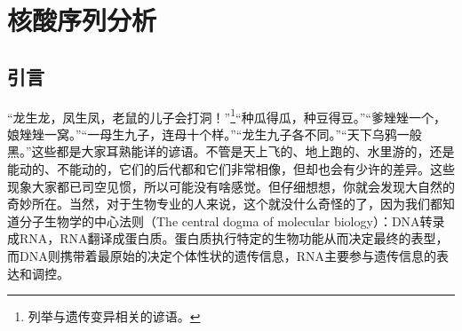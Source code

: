 \documentclass[11pt,a4paper,twoside]{book}
\begin{document}
\setcounter{chapter}{3}
\chapter{核酸序列分析}

\noindent
{}

\section{引言}
  “龙生龙，凤生凤，老鼠的儿子会打洞！”\footnote{列举与遗传变异相关的谚语。}“种瓜得瓜，种豆得豆。”“爹矬矬一个，娘矬矬一窝。”“一母生九子，连母十个样。”“龙生九子各不同。”“天下乌鸦一般黑。”这些都是大家耳熟能详的谚语。不管是天上飞的、地上跑的、水里游的，还是能动的、不能动的，它们的后代都和它们非常相像，但却也会有少许的差异。这些现象大家都已司空见惯，所以可能没有啥感觉。但仔细想想，你就会发现大自然的奇妙所在。当然，对于生物专业的人来说，这个就没什么奇怪的了，因为我们都知道分子生物学的中心法则（The central dogma of molecular biology）：DNA转录成RNA，RNA翻译成蛋白质。蛋白质执行特定的生物功能从而决定最终的表型，而DNA则携带着最原始的决定个体性状的遗传信息，RNA主要参与遗传信息的表达和调控。
\end{document}
